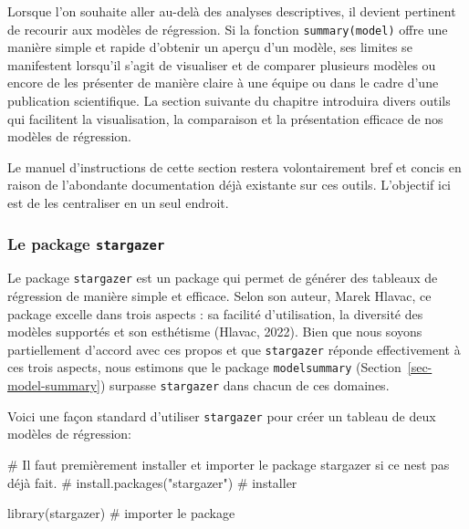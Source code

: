 \documentclass[
  letterpaper,
  DIV=11,
  numbers=noendperiod]{scrreprt}
\newenvironment{Shaded}{\begin{snugshade}}{\end{snugshade}}
\newcommand{\CommentTok}[1]{\textcolor[rgb]{0.37,0.37,0.37}{#1}}
\newcommand{\FunctionTok}[1]{\textcolor[rgb]{0.28,0.35,0.67}{#1}}
\newcommand{\NormalTok}[1]{\textcolor[rgb]{0.00,0.23,0.31}{#1}}
\begin{document}
Lorsque l'on souhaite aller au-delà des analyses descriptives, il
devient pertinent de recourir aux modèles de régression. Si la fonction
\texttt{summary(model)} offre une manière simple et rapide d'obtenir un
aperçu d'un modèle, ses limites se manifestent lorsqu'il s'agit de
visualiser et de comparer plusieurs modèles ou encore de les présenter
de manière claire à une équipe ou dans le cadre d'une publication
scientifique. La section suivante du chapitre introduira divers outils
qui facilitent la visualisation, la comparaison et la présentation
efficace de nos modèles de régression.

\begin{tcolorbox}[enhanced jigsaw, opacitybacktitle=0.6, breakable, left=2mm, titlerule=0mm, arc=.35mm, bottomrule=.15mm, rightrule=.15mm, opacityback=0, toprule=.15mm, bottomtitle=1mm, coltitle=black, colframe=quarto-callout-note-color-frame, colback=white, title=\textcolor{quarto-callout-note-color}{\faInfo}\hspace{0.5em}{Note}, toptitle=1mm, colbacktitle=quarto-callout-note-color!10!white, leftrule=.75mm]

Le manuel d'instructions de cette section restera volontairement bref et
concis en raison de l'abondante documentation déjà existante sur ces
outils. L'objectif ici est de les centraliser en un seul endroit.

\end{tcolorbox}

\subsubsection{\texorpdfstring{Le package
\texttt{stargazer}}{Le package stargazer}}\label{le-package-stargazer}

Le package \texttt{stargazer} est un package qui permet de générer des
tableaux de régression de manière simple et efficace. Selon son auteur,
Marek Hlavac, ce package excelle dans trois aspects : sa facilité
d'utilisation, la diversité des modèles supportés et son esthétisme
(Hlavac, 2022). Bien que nous soyons partiellement d'accord avec ces
propos et que \texttt{stargazer} réponde effectivement à ces trois
aspects, nous estimons que le package \texttt{modelsummary}
(Section~\ref{sec-model-summary}) surpasse \texttt{stargazer} dans
chacun de ces domaines.

Voici une façon standard d'utiliser \texttt{stargazer} pour créer un
tableau de deux modèles de régression:

\begin{Shaded}
\begin{Highlighting}[]
\CommentTok{\# Il faut premièrement installer et importer le package stargazer si ce n\textquotesingle{}est pas déjà fait.}
\CommentTok{\# install.packages("stargazer") \# installer}

\FunctionTok{library}\NormalTok{(stargazer) }\CommentTok{\# importer le package}
\end{Highlighting}
\end{Shaded}
\end{document}
